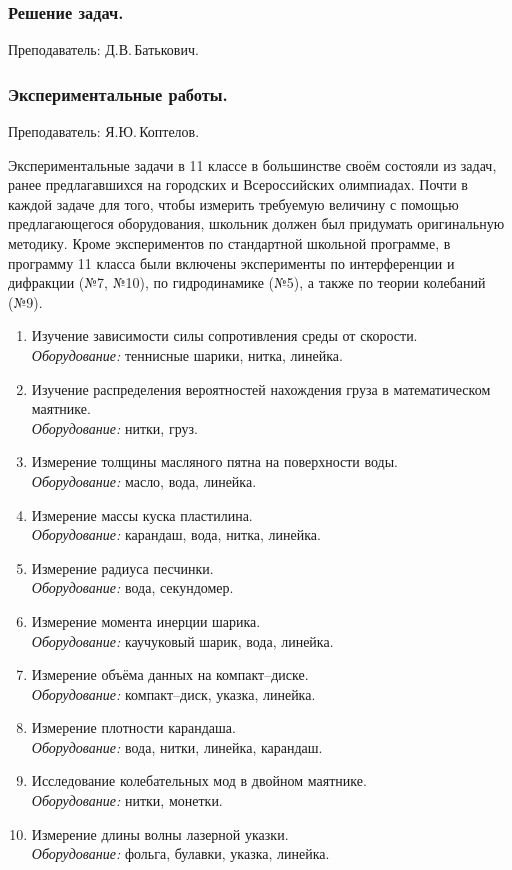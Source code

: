 \documentclass[12pt,a4paper,oneside,draft]{scrartcl}
\newlength{\h}
\newlength{\x}
\begin{document}
\subsubsection{Решение задач.}
\label{sec:daily_11_problems}

\textsf{Преподаватель: Д.В.\,Батькович.}
\smallskip

\subsubsection{Экспериментальные работы.}
\label{sec:daily_11_exp}

\textsf{Преподаватель: Я.Ю.\,Коптелов.}
\smallskip

Экспериментальные задачи в 11 классе в большинстве своём состояли из
задач, ранее предлагавшихся на городских и Всероссийских
олимпиадах. Почти в каждой задаче для того, чтобы измерить требуемую
величину с помощью предлагающегося оборудования, школьник должен был
придумать оригинальную методику. Кроме экспериментов по стандартной
школьной программе, в программу 11 класса были включены эксперименты
по интерференции и дифракции (№7, №10), по гидродинамике (№5), а также
по теории колебаний (№9).

\begin{enumerate}
\item Изучение зависимости силы сопротивления среды от скорости. \\
  \textit{Оборудование:} теннисные шарики, нитка, линейка.
\item Изучение распределения вероятностей нахождения груза в
  математическом маятнике. \\ \textit{Оборудование:} нитки, груз.
\item Измерение толщины масляного пятна на поверхности воды. \\
  \textit{Оборудование:} масло, вода, линейка.
\item Измерение массы куска пластилина. \\ \textit{Оборудование:}
  карандаш, вода, нитка, линейка.
\item Измерение радиуса песчинки. \\ \textit{Оборудование:} вода, секундомер.
\item Измерение момента инерции шарика. \\ \textit{Оборудование:}
  каучуковый шарик, вода, линейка.
\item Измерение объёма данных на компакт--диске. \\
  \textit{Оборудование:} компакт--диск, указка, линейка.
\item Измерение плотности карандаша. \\ \textit{Оборудование:} вода,
  нитки, линейка, карандаш.
\item Исследование колебательных мод в двойном маятнике. \\
  \textit{Оборудование:} нитки, монетки.
\item Измерение длины волны лазерной указки. \\ \textit{Оборудование:}
  фольга, булавки, указка, линейка.
\end{enumerate}
\end{document}

